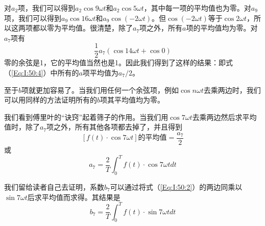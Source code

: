 对$a_2$项，我们可以得到$a_2 \cos 9\omega t$和$a_2 \cos 5 \omega t$，其中每一项的平均值也为零。对$a_9$项，我们可以得到$a_9\cos 16\omega t$和$a_9\cos(-2\omega t)$。但$\cos(-2\omega t)$等于$\cos2\omega t$，所以这两项都以零为平均值。很清楚，除了$a_7$项之外，所有$a$项的平均值均为零。对$a_7$项有
\begin{equation}
    \label{Eq:I:50:7}
    \frac{1}{2}a_7(\cos 14\omega t + \cos 0)
\end{equation}
零的余弦是1，它的平均值当然也是1。因此我们得到了这样的结果：即式（\ref{Eq:I:50:4}）中所有的$a$项平均值为$a_7/2$。

至于$b$项就更加容易了。当我们用任何一个余弦项，例如$\cos n\omega t$去乘两边时，我们可以用同样的方法证明所有的$b$项其平均值均为零。

我们看到傅里叶的“诀窍”起着筛子的作用。当我们用$\cos 7\omega t$去乘两边然后求平均值时，除了$a_7$项之外，所有其他各项都去掉了，并且得到
\begin{equation}
    \label{Eq:I:50:8}
    \left[f(t)\cdot\cos 7\omega t\right]\text{的平均值} = \frac{a_7}{2}
\end{equation}
或
\begin{equation}
    \label{Eq:I:50:9}
    a_7 = \frac{2}{T}\int_0^T f(t)\cdot\cos 7\omega t dt
\end{equation}

我们留给读者自己去证明，系数$b_7$可以通过将式（\ref{Eq:I:50:2}）的两边同乘以$\sin 7\omega t$后求平均值而求得。其结果是
\begin{equation}
    \label{Eq:I:50:10}
    b_7 = \frac{2}{T}\int_0^T f(t)\cdot\sin 7 \omega t dt
\end{equation}

